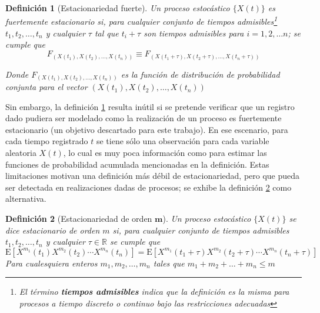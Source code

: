\documentclass[12pt,a4paper]{mitthesis}
\newtheorem{defn}{Definici\'on}
\newcommand{\R}{\mathbb{R}}
\newcommand{\E}[1]{\mathrm{E}\left[ #1 \right]}
\begin{document}
\begin{defn}[Estacionariedad fuerte]
Un proceso estoc\'astico $\{ X(t) \}$ es fuertemente estacionario si, para cualquier conjunto de 
tiempos admisibles\footnote{El t\'ermino \textbf{tiempos admisibles} indica que la definici\'on es 
la misma para procesos a tiempo discreto o continuo bajo las restricciones adecuadas} 
$t_1,t_2,\dots,t_n$ y cualquier $\tau$ tal que $t_i+\tau$ son tiempos admisibles para 
$i = 1, 2, \dots n$; se cumple que
\begin{equation*}
F_{\left(X(t_1),X(t_2),\dots,X(t_n)\right) }
\equiv
F_{\left(X(t_1+\tau),X(t_2+\tau),\dots,X(t_n+\tau)\right)}
\end{equation*}

Donde $F_{\left(X(t_1),X(t_2),\dots,X(t_n)\right) }$ es la funci\'on de distribuci\'on de 
probabilidad conjunta para el vector $\left(X(t_1),X(t_2),\dots,X(t_n)\right)$
\label{est_fuerte}
\end{defn}

Sin embargo, la definici\'on \ref{est_fuerte} resulta in\'util si se pretende verificar que un 
registro dado pudiera ser modelado como la realizaci\'on de un proceso es fuertemente estacionario 
(un objetivo descartado para este trabajo). En ese escenario, para cada tiempo registrado $t$ se 
tiene s\'olo una observaci\'on para cada variable aleatoria $X(t)$, lo cual es muy poca 
informaci\'on como para estimar las funciones de probabilidad acumulada mencionadas en la 
definici\'on.
Estas limitaciones motivan una definici\'on m\'as d\'ebil de estacionariedad, pero que pueda ser 
detectada en realizaciones dadas de procesos; se exhibe la definici\'on \ref{est_orden_m} como 
alternativa.

\begin{defn}[Estacionariedad de orden $\boldsymbol{m}$]
Un proceso estoc\'astico $\{ X(t) \}$ se dice estacionario de orden $m$ si, para cualquier conjunto 
de tiempos admisibles $t_1,t_2,\dots,t_n$ y cualquier $\tau \in \R$ se cumple que
\begin{equation*}
\E{ X^{m_1}(t_1)X^{m_2}(t_2)\cdots X^{m_n}(t_n) }
=
\E{ X^{m_1}(t_1+\tau)X^{m_2}(t_2+\tau)\cdots X^{m_n}(t_n+\tau) }
\end{equation*}
Para cualesquiera enteros $m_1,m_2,\dots,m_n$ tales que $m_1+m_2+\dots+m_n \leq m$
\label{est_orden_m}
\end{defn}
\end{document}
